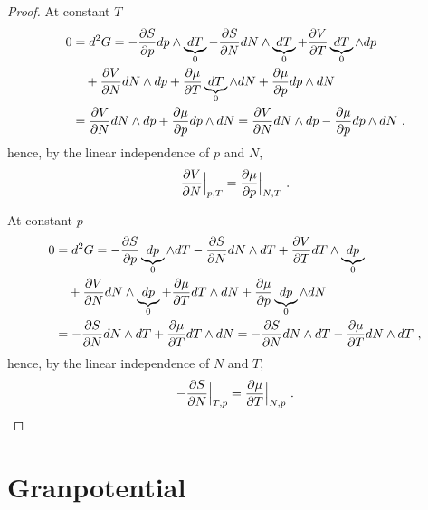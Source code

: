 \begin{proof}
        At constant $T$ 
        \begin{equation*}
        \begin{aligned}
            0 & = d^2 G = - \frac{\partial S}{\partial p} dp \wedge \underbrace{dT}_0 - \frac{\partial S}{\partial N} dN \wedge \underbrace{dT}_0 + \frac{\partial V}{\partial T} \underbrace{dT}_0 \wedge dp \\ & \quad + \frac{\partial V}{\partial N} dN \wedge dp + \frac{\partial\mu}{\partial T} \underbrace{dT}_0 \wedge dN + \frac{\partial\mu}{\partial p} dp \wedge dN \\ & = \frac{\partial V}{\partial N} dN \wedge dp + \frac{\partial\mu}{\partial p} dp \wedge dN = \frac{\partial V}{\partial N} dN \wedge dp - \frac{\partial\mu}{\partial p} dp \wedge dN ~,
        \end{aligned}
        \end{equation*}
        hence, by the linear independence of $p$ and $N$,
        \begin{equation*}
            \frac{\partial V}{\partial N} \Big \vert_{p,T} = \frac{\partial\mu}{\partial p} \Big \vert_{N, T} ~.
        \end{equation*}

        At constant $p$ 
        \begin{equation*}
        \begin{aligned}
            0 & = d^2 G = - \frac{\partial S}{\partial p} \underbrace{dp}_0 \wedge dT - \frac{\partial S}{\partial N} dN \wedge dT + \frac{\partial V}{\partial T} dT \wedge \underbrace{dp}_0 \\ & \quad + \frac{\partial V}{\partial N} dN \wedge \underbrace{dp}_0 + \frac{\partial\mu}{\partial T} dT \wedge dN + \frac{\partial\mu}{\partial p} \underbrace{dp}_0 \wedge dN \\ & = - \frac{\partial S}{\partial N} dN \wedge dT + \frac{\partial\mu}{\partial T} dT \wedge dN = - \frac{\partial S}{\partial N} dN \wedge dT - \frac{\partial\mu}{\partial T} dN \wedge dT ~,
        \end{aligned}
        \end{equation*}
        hence, by the linear independence of $N$ and $T$,
        \begin{equation*}
            - \frac{\partial S}{\partial N} \Big \vert_{T,p} = \frac{\partial\mu}{\partial T} \Big \vert_{N, p} ~.
        \end{equation*}

    \end{proof}

\section{Granpotential} 

